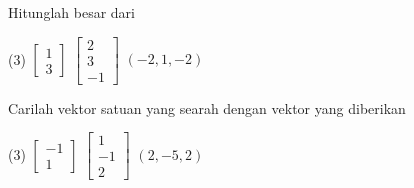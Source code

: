 \setcounter{exercise}{100}

\begin{exercise}
Hitunglah besar dari
\begin{tasks}(3)
\task
$\begin{bmatrix}
1 \\
3
\end{bmatrix}
$
\task
$\begin{bmatrix}
2 \\
3 \\
-1
\end{bmatrix}
$
\task
$(-2,1,-2)$
\end{tasks}
\end{exercise}

\begin{exercise}
Carilah vektor satuan yang searah dengan vektor yang diberikan
\begin{tasks}(3)
\task
$\begin{bmatrix}
-1 \\
1
\end{bmatrix}
$
\task
$\begin{bmatrix}
1 \\
-1 \\
2
\end{bmatrix}
$
\task
$(2,-5,2)$
\end{tasks}
\end{exercise}

